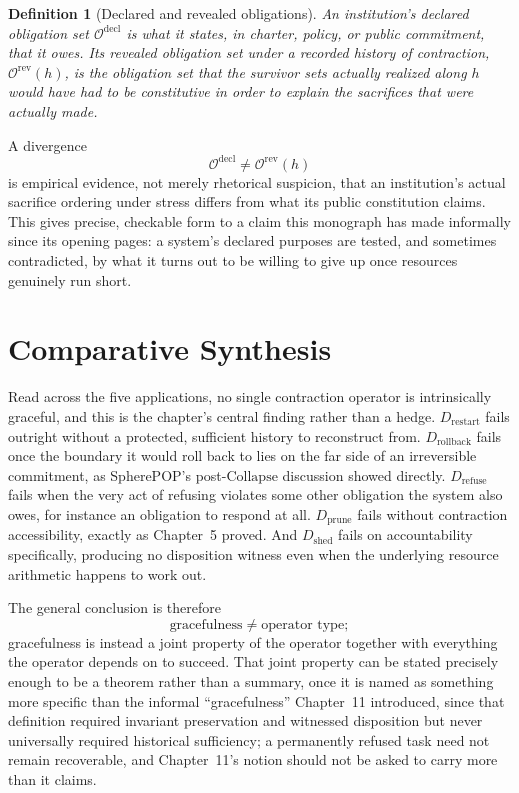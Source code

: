 \documentclass[11pt]{report}
\newtheorem{definition}{Definition}[chapter]
\newcommand{\Collapse}{\mathrm{Collapse}}
\begin{document}
\begin{definition}[Declared and revealed obligations]
An institution's declared obligation set $\mathcal O^{\mathrm{decl}}$ is what it states, in charter, policy, or public commitment, that it owes. Its revealed obligation set under a recorded history of contraction, $\mathcal O^{\mathrm{rev}}(h)$, is the obligation set that the survivor sets actually realized along $h$ would have had to be constitutive in order to explain the sacrifices that were actually made.
\end{definition}

A divergence
\[
\mathcal O^{\mathrm{decl}} \ne \mathcal O^{\mathrm{rev}}(h)
\]
is empirical evidence, not merely rhetorical suspicion, that an institution's actual sacrifice ordering under stress differs from what its public constitution claims. This gives precise, checkable form to a claim this monograph has made informally since its opening pages: a system's declared purposes are tested, and sometimes contradicted, by what it turns out to be willing to give up once resources genuinely run short.

\chapter{Comparative Synthesis}

Read across the five applications, no single contraction operator is intrinsically graceful, and this is the chapter's central finding rather than a hedge. $D_{\mathrm{restart}}$ fails outright without a protected, sufficient history to reconstruct from. $D_{\mathrm{rollback}}$ fails once the boundary it would roll back to lies on the far side of an irreversible commitment, as SpherePOP's post-$\Collapse$ discussion showed directly. $D_{\mathrm{refuse}}$ fails when the very act of refusing violates some other obligation the system also owes, for instance an obligation to respond at all. $D_{\mathrm{prune}}$ fails without contraction accessibility, exactly as Chapter~5 proved. And $D_{\mathrm{shed}}$ fails on accountability specifically, producing no disposition witness even when the underlying resource arithmetic happens to work out.

The general conclusion is therefore
\[
\text{gracefulness} \ne \text{operator type};
\]
gracefulness is instead a joint property of the operator together with everything the operator depends on to succeed. That joint property can be stated precisely enough to be a theorem rather than a summary, once it is named as something more specific than the informal ``gracefulness'' Chapter~11 introduced, since that definition required invariant preservation and witnessed disposition but never universally required historical sufficiency; a permanently refused task need not remain recoverable, and Chapter~11's notion should not be asked to carry more than it claims.
\end{document}
